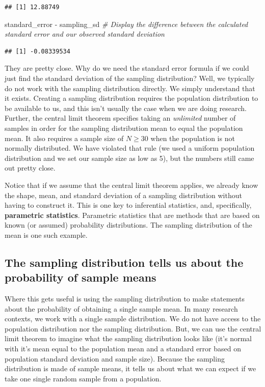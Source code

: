 \documentclass[
]{book}
\newenvironment{Shaded}{\begin{snugshade}}{\end{snugshade}}
\newcommand{\CommentTok}[1]{\textcolor[rgb]{0.56,0.35,0.01}{\textit{#1}}}
\newcommand{\NormalTok}[1]{#1}
\newcommand{\SpecialCharTok}[1]{\textcolor[rgb]{0.00,0.00,0.00}{#1}}
\begin{document}
\begin{verbatim}
## [1] 12.88749
\end{verbatim}

\begin{Shaded}
\begin{Highlighting}[]
\NormalTok{standard\_error }\SpecialCharTok{{-}}\NormalTok{ sampling\_sd }\CommentTok{\# Display the difference between the calculated standard error and our observed standard deviation}
\end{Highlighting}
\end{Shaded}

\begin{verbatim}
## [1] -0.08339534
\end{verbatim}

They are pretty close. Why do we need the standard error formula if we could just find the standard deviation of the sampling distribution? Well, we typically do not work with the sampling distribution directly. We simply understand that it exists. Creating a sampling distribution requires the population distribution to be available to us, and this isn't usually the case when we are doing research. Further, the central limit theorem specifies taking an \emph{unlimited} number of samples in order for the sampling distribution mean to equal the population mean. It also requires a sample size of \(N\ge30\) when the population is not normally distributed. We have violated that rule (we used a uniform population distribution and we set our sample size as low as 5), but the numbers still came out pretty close.

Notice that if we assume that the central limit theorem applies, we already know the shape, mean, and standard deviation of a sampling distribution without having to construct it. This is one key to inferential statistics, and, specifically, \textbf{parametric statistics}. Parametric statistics that are methods that are based on known (or assumed) probability distributions. The sampling distribution of the mean is one such example.

\hypertarget{the-sampling-distribution-tells-us-about-the-probability-of-sample-means}{%
\subsection{The sampling distribution tells us about the probability of sample means}\label{the-sampling-distribution-tells-us-about-the-probability-of-sample-means}}

Where this gets useful is using the sampling distribution to make statements about the probability of obtaining a single sample mean. In many research contexts, we work with a single sample distribution. We do not have access to the population distribution nor the sampling distribution. But, we can use the central limit theorem to imagine what the sampling distribution looks like (it's normal with it's mean equal to the population mean and a standard error based on population standard deviation and sample size). Because the sampling distribution is made of sample means, it tells us about what we can expect if we take one single random sample from a population.
\end{document}

